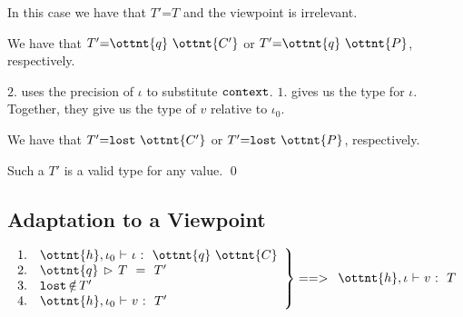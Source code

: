 In this case we have that $T'  \textsf{=}  T$ and the viewpoint is
irrelevant.




We have that $T'  \textsf{=}    \ottnt{q} \  \ottnt{C'}  $ or $T'  \textsf{=}    \ottnt{q} \  \ottnt{P}  $, respectively.

$2.$ uses the precision of $\iota$ to substitute $ \texttt{\upshape{context}\,\!} $.
$1.$ gives us the type for $\iota$.
Together, they give us the type of $v$ relative to $\iota_{{\mathrm{0}}}$.


We have that $T'  \textsf{=}     \texttt{\upshape{lost}\,\!}  \  \ottnt{C'}  $ or $T'  \textsf{=}     \texttt{\upshape{lost}\,\!}  \  \ottnt{P}  $, respectively.

Such a $T'$ is a valid type for any value.
\qed




\subsection{Adaptation to a Viewpoint}

\begin{lemma}
\label{enerj:lemma:decomp}
\[
\left.
\begin{array}{ll}
1. &  \ottnt{h} ,  \iota_{{\mathrm{0}}} \  \textsf{$\vdash$} \  \iota \  \textsf{:} \ \    \ottnt{q} \  \ottnt{C}   \\
2. &  \ottnt{q} \, \rhd\,  T \ \  \textsf{=} \ \  T' \\
3. &  \texttt{\upshape{lost}\,\!}  \, \textsf{$\notin$} \, T'\\
4. &  \ottnt{h} ,  \iota_{{\mathrm{0}}} \  \textsf{$\vdash$} \  v \  \textsf{:} \ \  T' \\
\end{array}
\right\} ==>
\begin{array}{l}
 \ottnt{h} ,  \iota \  \textsf{$\vdash$} \  v \  \textsf{:} \ \  T 
\end{array}
\]
\end{lemma}

